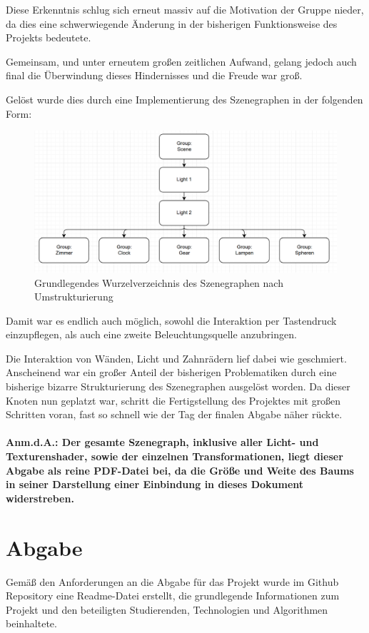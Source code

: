 \documentclass{article}
\begin{document}
Diese Erkenntnis schlug sich erneut massiv auf die Motivation der Gruppe nieder, da dies eine schwerwiegende Änderung in der bisherigen Funktionsweise des Projekts bedeutete. 

Gemeinsam, und unter erneutem großen zeitlichen Aufwand, gelang jedoch auch final die Überwindung dieses Hindernisses und die Freude war groß. 

Gelöst wurde dies durch eine Implementierung des Szenegraphen in der folgenden Form: 

\begin{figure}[h!]
\centering
\includegraphics[scale=0.6]{res/Szenegraph_root.png}
\caption{Grundlegendes Wurzelverzeichnis des Szenegraphen nach Umstrukturierung}
\label{fig:Scenegraph_root}
\end{figure}

Damit war es endlich auch möglich, sowohl die Interaktion per Tastendruck einzupflegen, als auch eine zweite Beleuchtungsquelle anzubringen. 

Die Interaktion von Wänden, Licht und Zahnrädern lief dabei wie geschmiert. 
Anscheinend war ein großer Anteil der bisherigen Problematiken durch eine bisherige bizarre Strukturierung des Szenegraphen ausgelöst worden. 
Da dieser Knoten nun geplatzt war, schritt die Fertigstellung des Projektes mit großen Schritten voran, fast so schnell wie der Tag der finalen Abgabe näher rückte. 

\paragraph{Anm.d.A.: Der gesamte Szenegraph, inklusive aller Licht- und Texturenshader, sowie der einzelnen Transformationen, liegt dieser Abgabe als reine PDF-Datei bei, da die Größe und Weite des Baums in seiner Darstellung einer Einbindung in dieses Dokument widerstreben. }

\section{Abgabe}
Gemäß den Anforderungen an die Abgabe für das Projekt wurde im Github Repository eine Readme-Datei erstellt, die grundlegende Informationen zum Projekt und den beteiligten Studierenden, Technologien und Algorithmen beinhaltete. 
\end{document}
